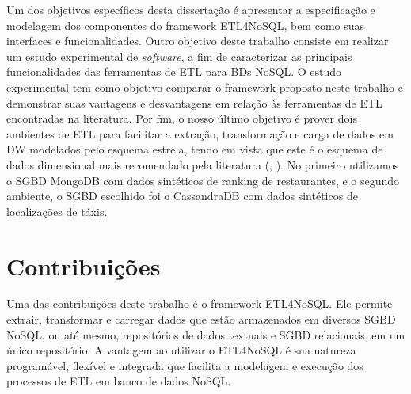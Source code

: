 Um dos objetivos específicos desta dissertação é apresentar a especificação e modelagem dos componentes do framework ETL4NoSQL, bem como suas interfaces e funcionalidades. Outro objetivo deste trabalho consiste em realizar um estudo experimental de \textit{software}, a fim de caracterizar as principais funcionalidades das ferramentas de ETL para BDs NoSQL. O estudo experimental tem como objetivo comparar o framework proposto neste trabalho e demonstrar suas vantagens e desvantagens em relação às ferramentas de ETL encontradas na literatura. Por fim, o nosso último objetivo é prover dois ambientes de ETL para facilitar a extração, transformação e carga de dados em DW modelados pelo esquema estrela, tendo em vista que este é o esquema de dados dimensional mais recomendado pela literatura (\cite{inmon:2002}, \cite{kimball:2002}). No primeiro utilizamos o SGBD MongoDB com dados sintéticos de ranking de restaurantes, e o segundo ambiente, o SGBD escolhido foi o CassandraDB com dados sintéticos de localizações de táxis.




\section{Contribuições}

Uma das contribuições deste trabalho é o framework ETL4NoSQL. Ele permite extrair, transformar e carregar dados que estão armazenados em diversos SGBD NoSQL, ou até mesmo, repositórios de dados textuais e SGBD relacionais, em um único repositório. A vantagem ao utilizar o ETL4NoSQL é sua natureza programável, flexível e integrada que facilita a modelagem e execução dos processos de ETL em banco de dados NoSQL.

